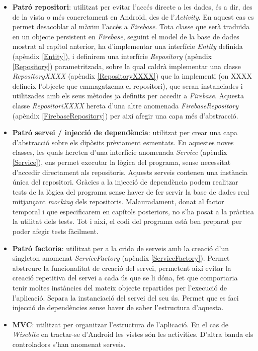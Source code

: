 \begin{itemize}
\item \textbf{Patró repositori}: utilitzat per evitar l'accés directe a les dades, és a dir, des de la vista o més concretament en Android, des de l'\textit{Activity}. En aquest cas es permet desacoblar al màxim l'accés a \textit{Firebase}. Tota classe que serà traduïda en un objecte persistent en \textit{Firebase}, seguint el model de la base de dades mostrat al capítol anterior, ha d'implementar una interfície \textit{Entity} definida (apèndix \ref{Entity}), i definirem una interfície \textit{Repository} (apèndix \ref{Repository}) parametritzada, sobre la qual caldrà implementar una classe \textit{RepositoryXXXX} (apèndix \ref{RepositoryXXXX}) que la implementi (on XXXX defineix l'objecte que emmagatzema el repositori), que seran instanciades i utilitzades amb els seus mètodes ja definits per accedir a \textit{Firebase}. Aquesta classe \textit{RepositoriXXXX} hereta d'una altre anomenada \textit{FirebaseRepository} (apèndix \ref{FirebaseRepository}) per així afegir una capa més d'abstracció.

\item \textbf{Patró servei / injecció de dependència}: utilitzat per crear una capa d'abstracció sobre els dipòsits prèviament esmentats. En aquestes noves classes, les quals hereten d'una interfície anomenada \textit{Service} (apèndix \ref{Service}), ens permet executar la lògica del programa, sense necessitat d'accedir directament als repositoris. Aquests serveis contenen una instància única del repositori. Gràcies a la injecció de dependència podem realitzar tests de la lògica del programa sense haver de fer servir la base de dades real mitjançant \textit{mocking} dels repositoris. Malauradament, donat al factor temporal i que especificarem en capítols posteriors, no s'ha posat a la pràctica la utilitat dels tests. Tot i així, el codi del programa està ben preparat per poder afegir tests fàcilment.

\item \textbf{Patró factoria}: utilitzat per a la crida de serveis amb la creació d'un singleton anomenat \textit{ServiceFactory} (apèndix \ref{ServiceFactory}). Permet abstreure la funcionalitat de creació del servei, permetent així evitar la creació repetitiva del servei a cada ús que se li dóna, fet que comportaria tenir moltes instàncies del mateix objecte repartides per l'execució de l'aplicació. Separa la instanciació del servei del seu ús. Permet que es faci injecció de dependències sense haver de saber l'estructura d'aquesta.

\item \textbf{MVC}: utilitzat per organitzar l'estructura de l'aplicació. En el cas de \textit{Wisebite} en tractar-se d'Android les vistes són les activities. D'altra banda els controladors s'han anomenat serveis.
\end{itemize}

